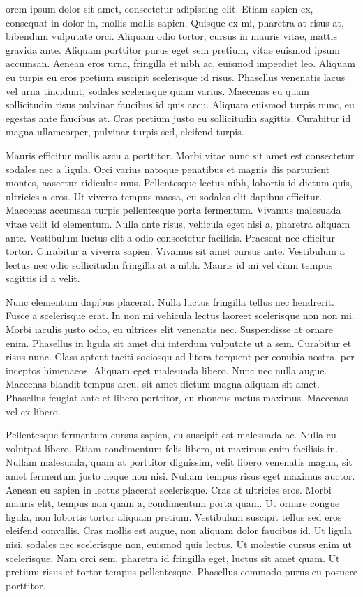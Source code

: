 orem ipsum dolor sit amet, consectetur adipiscing elit. Etiam sapien ex, consequat in dolor in, mollis mollis sapien. Quisque ex mi, pharetra at risus at, bibendum vulputate orci. Aliquam odio tortor, cursus in mauris vitae, mattis gravida ante. Aliquam porttitor purus eget sem pretium, vitae euismod ipsum accumsan. Aenean eros urna, fringilla et nibh ac, euismod imperdiet leo. Aliquam eu turpis eu eros pretium suscipit scelerisque id risus. Phasellus venenatis lacus vel urna tincidunt, sodales scelerisque quam varius. Maecenas eu quam sollicitudin risus pulvinar faucibus id quis arcu. Aliquam euismod turpis nunc, eu egestas ante faucibus at. Cras pretium justo eu sollicitudin sagittis. Curabitur id magna ullamcorper, pulvinar turpis sed, eleifend turpis.

Mauris efficitur mollis arcu a porttitor. Morbi vitae nunc sit amet est consectetur sodales nec a ligula. Orci varius natoque penatibus et magnis dis parturient montes, nascetur ridiculus mus. Pellentesque lectus nibh, lobortis id dictum quis, ultricies a eros. Ut viverra tempus massa, eu sodales elit dapibus efficitur. Maecenas accumsan turpis pellentesque porta fermentum. Vivamus malesuada vitae velit id elementum. Nulla ante risus, vehicula eget nisi a, pharetra aliquam ante. Vestibulum luctus elit a odio consectetur facilisis. Praesent nec efficitur tortor. Curabitur a viverra sapien. Vivamus sit amet cursus ante. Vestibulum a lectus nec odio sollicitudin fringilla at a nibh. Mauris id mi vel diam tempus sagittis id a velit.

Nunc elementum dapibus placerat. Nulla luctus fringilla tellus nec hendrerit. Fusce a scelerisque erat. In non mi vehicula lectus laoreet scelerisque non non mi. Morbi iaculis justo odio, eu ultrices elit venenatis nec. Suspendisse at ornare enim. Phasellus in ligula sit amet dui interdum vulputate ut a sem. Curabitur et risus nunc. Class aptent taciti sociosqu ad litora torquent per conubia nostra, per inceptos himenaeos. Aliquam eget malesuada libero. Nunc nec nulla augue. Maecenas blandit tempus arcu, sit amet dictum magna aliquam sit amet. Phasellus feugiat ante et libero porttitor, eu rhoncus metus maximus. Maecenas vel ex libero.

Pellentesque fermentum cursus sapien, eu suscipit est malesuada ac. Nulla eu volutpat libero. Etiam condimentum felis libero, ut maximus enim facilisis in. Nullam malesuada, quam at porttitor dignissim, velit libero venenatis magna, sit amet fermentum justo neque non nisi. Nullam tempus risus eget maximus auctor. Aenean eu sapien in lectus placerat scelerisque. Cras at ultricies eros. Morbi mauris elit, tempus non quam a, condimentum porta quam. Ut ornare congue ligula, non lobortis tortor aliquam pretium. Vestibulum suscipit tellus sed eros eleifend convallis. Cras mollis est augue, non aliquam dolor faucibus id. Ut ligula nisi, sodales nec scelerisque non, euismod quis lectus. Ut molestie cursus enim ut scelerisque. Nam orci sem, pharetra id fringilla eget, luctus sit amet quam. Ut pretium risus et tortor tempus pellentesque. Phasellus commodo purus eu posuere porttitor.

